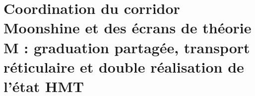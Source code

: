 





\chapter{Coordination du corridor Moonshine et des écrans de théorie M : graduation partagée, transport réticulaire et double réalisation de l'état HMT}
\label{chap:sucesor-102-25}
\label{chap:pantallas-teoria-m}


\begin{HMTScientificOwnerSubordinated}

\end{HMTScientificOwnerSubordinated}
\begingroup
\let\HMTTheoryMOriginalSection\section
\let\HMTTheoryMOriginalSubsection\subsection
\def\section[#1]#2{%
  \HMTTheoryMOriginalSection[Extension opératorielle d'APP et triplet spectral en dimension 11]{Extension opératorielle d'APP et triplet spectral de l'interface supersymétrique en dimension \texorpdfstring{\(11\)}{11}}%
}
\newcount\HMTTheoryMSubsection
{}
\renewcommand{\subsection}[1]{%
  \advance\HMTTheoryMSubsection by 1
  \ifnum\HMTTheoryMSubsection=1
    \HMTTheoryMOriginalSubsection{Extension opératorielle de l'état APP--TRIT--TPK vers le triplet \texorpdfstring{\((\mathcal H_{\mathrm{phys}},H,Q)\)}{(Hphys,H,Q)}}%
  \else
    \HMTTheoryMOriginalSubsection{#1}%
  \fi
}

\endgroup
\begin{HMTScientificOwnerSubordinated}

\end{HMTScientificOwnerSubordinated}













